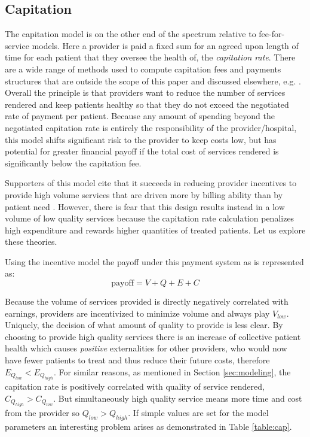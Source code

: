 \documentclass{article}
\begin{document}
\subsection{Capitation} \label{sec:capitation}
The capitation model is on the other end of the spectrum relative to fee-for-service models. Here a provider is paid a fixed sum for an agreed upon length of time for each patient that they oversee the health of, the \emph{capitation rate}. There are a wide range of methods used to compute capitation fees and payments structures that are outside the scope of this paper and discussed elsewhere, e.g. \cite{capfees}. Overall the principle is that providers want to reduce the number of services rendered and keep patients healthy so that they do not exceed the negotiated rate of payment per patient. Because any amount of spending beyond the negotiated capitation rate is entirely the responsibility of the provider/hospital, this model shifts significant risk to the provider to keep costs low, but has potential for greater financial payoff if the total cost of services rendered is significantly below the capitation fee.

Supporters of this model cite that it succeeds in reducing provider incentives to provide high volume services that are driven more by billing ability than by patient need \cite{blended}. However, there is fear that this design results instead in a low volume of low quality services because the capitation rate calculation penalizes high expenditure and rewards higher quantities of treated patients. Let us explore these theories.

Using the incentive model the payoff under this payment system as is represented as:
\begin{equation} \label{eq:cap}
    \text{payoff} = V + Q + E + C
\end{equation}

Because the volume of services provided is directly negatively correlated with earnings, providers are incentivized to minimize volume and always play $V_{low}$. Uniquely, the decision of what amount of quality to provide is less clear. By choosing to provide high quality services there is an increase of collective patient health which causes \emph{positive} externalities for other providers, who would now have fewer patients to treat and thus reduce their future costs, therefore $E_{Q_{low}} < E_{Q_{high}}$. For similar reasons, as mentioned in Section \ref{sec:modeling}, the capitation rate is positively correlated with quality of service rendered, $C_{Q_{high}} > C_{Q_{low}}$. But simultaneously high quality service means more time and cost from the provider so $Q_{low} > Q_{high}$. If simple values are set for the model parameters an interesting problem arises as demonstrated in Table \ref{table:cap}.
\end{document}
